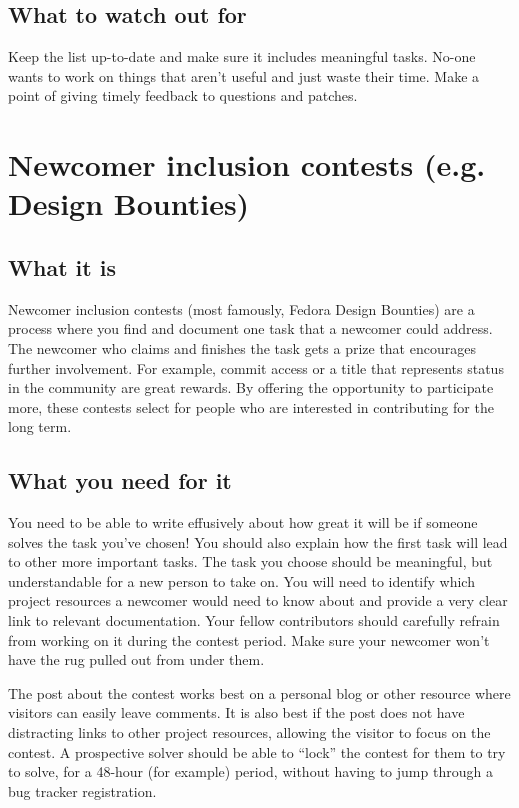 \subsection{What to watch out for}
Keep the list up-to-date and make sure it includes meaningful tasks. No-one wants to work on things that aren’t useful and just waste their time. Make a point of giving timely feedback to questions and patches.

\section{Newcomer inclusion contests (e.g. Design Bounties)}
\subsection{What it is}
Newcomer inclusion contests (most famously, Fedora Design Bounties) are a process where you find and document one task that a newcomer could address. The newcomer who claims and finishes the task gets a prize that encourages further involvement. For example, commit access or a title that represents status in the community are great rewards. By offering the opportunity to participate more, these contests select for people who are interested in contributing for the long term.

\subsection{What you need for it}
You need to be able to write effusively about how great it will be if someone solves the task you’ve chosen! You should also explain how the first task will lead to other more important tasks. The task you choose should be meaningful, but understandable for a new person to take on. You will need to identify which project resources a newcomer would need to know about and provide a very clear link to relevant documentation. Your fellow contributors should carefully refrain from working on it during the contest period. Make sure your newcomer won’t have the rug pulled out from under them. 

The post about the contest works best on a personal blog or other resource where visitors can easily leave comments. It is also best if the post does not have distracting links to other project resources, allowing the visitor to focus on the contest. A prospective solver should be able to “lock” the contest for them to try to solve, for a 48-hour (for example) period, without having to jump through a bug tracker registration.

